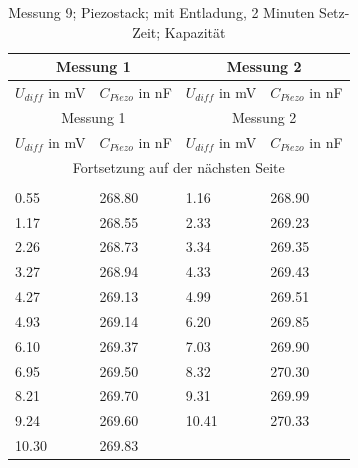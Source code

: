 \documentclass[12pt]{scrreprt} %
\begin{document}
\setlongtables
\begin{longtable}{| l | l | l | l |}
\hline
\multicolumn{2}{|c|}{Messung 1} &\multicolumn{2}{|c|}{Messung 2}\\
\hline
$U_{diff}$ in mV&$C_{Piezo}$ in nF&$U_{diff}$ in mV&$C_{Piezo}$ in nF\\
\hline
\endfirsthead
\hline
\multicolumn{2}{|c|}{Messung 1} &\multicolumn{2}{|c|}{Messung 2}\\
\hline
$U_{diff}$ in mV&$C_{Piezo}$ in nF&$U_{diff}$ in mV&$C_{Piezo}$ in nF\\
\hline
\endhead
\hline
\multicolumn{4}{|c|}{Fortsetzung auf der nächsten Seite}\\
\hline
\endfoot
\hline \hline
\caption[Messung 9; 2 Minuten Setz-Zeit; Piezostack; Kapazität]{Messung 9; Piezostack; mit Entladung, 2 Minuten Setz-Zeit; Kapazität}\\
\endlastfoot
\hline
\label{tab:2.9}%
0.55&268.80&1.16&268.90\\
1.17&268.55&2.33&269.23\\
2.26&268.73&3.34&269.35\\
3.27&268.94&4.33&269.43\\
4.27&269.13&4.99&269.51\\
4.93&269.14&6.20&269.85\\
6.10&269.37&7.03&269.90\\
6.95&269.50&8.32&270.30\\
8.21&269.70&9.31&269.99\\
9.24&269.60&10.41&270.33\\
10.30&269.83&&\\
\end{longtable}
\end{document}

